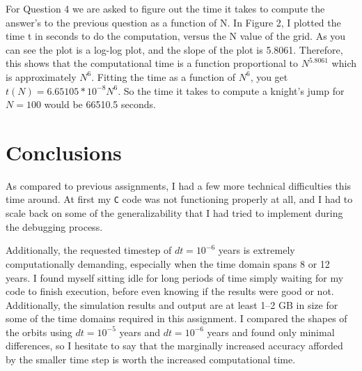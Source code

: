 \documentclass{article}
\begin{document}
For Question 4 we are asked to figure out the time it takes to compute the answer's to the previous question as a function of N. In Figure 2, I plotted the time t in seconds to do the computation, versus the N value of the grid. As you can see the plot is a log-log plot, and the slope of the 
plot is 5.8061. Therefore, this shows that the computational time is a function proportional to $N^{5.8061}$ which is  approximately $N^6$. Fitting the time as a function of $N^6$, you get $t(N)=6.65105*10^{-8}N^6$. So the time it takes to compute a knight's jump for $N=100$ would 
be 66510.5 seconds.   

\section{Conclusions}

As compared to previous assignments, I had a few more technical difficulties this time around. At first my \texttt{C} code was not functioning properly at all, and I had to scale back on some of the generalizability that I had tried to implement during the debugging process.

Additionally, the requested timestep of $dt=10^{-6}$ years is extremely computationally demanding, especially when the time domain spans 8 or 12 years. I found myself sitting idle for long periods of time simply waiting for my code to finish execution, before even knowing if the results were good or not. Additionally, the simulation results and output are at least 1--2 GB in size for some of the time domains required in this assignment. I compared the shapes of the orbits using $dt=10^{-5}$ years and $dt=10^{-6}$ years and found only minimal differences, so I hesitate to say that the marginally increased accuracy afforded by the smaller time step is worth the increased computational time.
\end{document}
